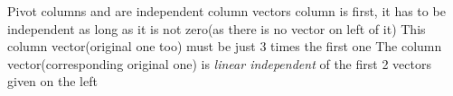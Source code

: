 \setlength{\leftskip}{3cm}
Pivot columns and are independent column vectors
column is first, it has to be independent as long as it is not zero(as there is no vector on left of it)
This column vector(original one too) must be just 3 times the first one
The column vector(corresponding original one) is \textit{linear independent} of the first 2 vectors given on the left
\setlength{\leftskip}{0pt}